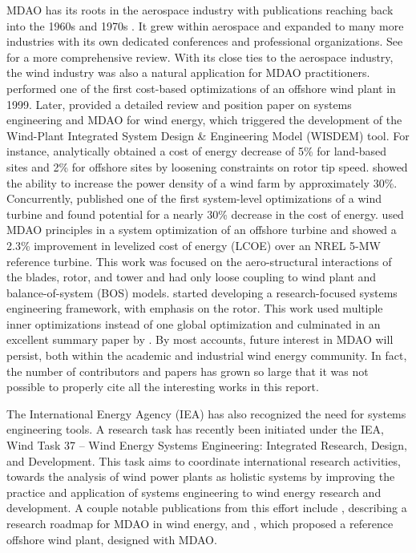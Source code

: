 MDAO has its roots in the aerospace industry with publications reaching
back into the 1960s and 1970s \citep{schmit60, haftka1977}. It grew
within aerospace and expanded to many more industries with its own
dedicated conferences and professional organizations. See
\citet{martins2013} for a more comprehensive review. With its close ties
to the aerospace industry, the wind industry was also a natural
application for MDAO practitioners. \citet{kuhn99} performed one of the
first cost-based optimizations of an offshore wind plant in 1999. Later,
\citet{dykes2011} provided a detailed review and position paper on
systems engineering and MDAO for wind energy, which triggered the
development of the Wind-Plant Integrated System Design \& Engineering
Model (WISDEM) tool. For instance, \citet{ning2014} analytically
obtained a cost of energy decrease of 5\% for land-based sites and 2\%
for offshore sites by loosening constraints on rotor tip
speed. \citet{fleming2016} showed the ability to increase the power
density of a wind farm by approximately 30\%. Concurrently,
\citet{maki2012} published one of the first system-level optimizations
of a wind turbine and found potential for a nearly 30\% decrease in the
cost of energy. \citet{ashuri2014} used MDAO principles in a system
optimization of an offshore turbine and showed a 2.3\% improvement in
levelized cost of energy (LCOE) over an NREL 5-MW reference
turbine. This work was focused on the aero-structural interactions of
the blades, rotor, and tower and had only loose coupling to wind plant
and balance-of-system (BOS) models.  \citet{bottasso2012} started
developing a research-focused systems engineering framework, with
emphasis on the rotor.  This work used multiple inner optimizations
instead of one global optimization and culminated in an excellent
summary paper by \citet{bortolotti2016}.  By most accounts, future
interest in MDAO will persist, both within the academic and industrial
wind energy community.  In fact, the number of contributors and papers
has grown so large that it was not possible to properly cite all the
interesting works in this report.

The International Energy Agency (IEA) has also recognized the need for
systems engineering tools. A research task has recently been initiated
under the IEA, Wind Task 37 – Wind Energy Systems Engineering:
Integrated Research, Design, and Development.  This task aims to
coordinate international research activities, towards the analysis of
wind power plants as holistic systems by improving the practice and
application of systems engineering to wind energy research and
development.  A couple notable publications from this effort include
\citet{perez2016}, describing a research roadmap for MDAO in wind
energy, and \citet{perez2018}, which proposed a reference offshore wind
plant, designed with MDAO.

